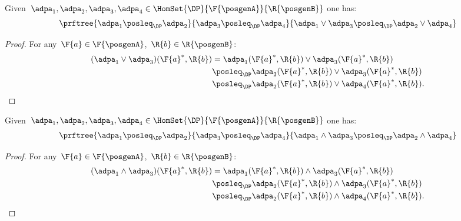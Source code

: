 \begin{lemma}
  \label{lem:coprod_mon}
  Given~$\adpa_1,\adpa_2,\adpa_3,\adpa_4 \in \HomSet{\DP}{\F{\posgenA}}{\R{\posgenB}}$ one has:
  \begin{equation*}
  \prftree{\adpa_1\posleq_\DP \adpa_2}{\adpa_3\posleq_\DP \adpa_4}{\adpa_1\vee \adpa_3\posleq_\DP \adpa_2\vee \adpa_4}
  \end{equation*}
\end{lemma}
\begin{proof}
  For any~$\F{a}\in \F{\posgenA}$,~$\R{b}\in \R{\posgenB}$:
  \begin{equation*}
    \begin{aligned}
      (\adpa_1 \vee \adpa_3)(\F{a}^*,\R{b})&=\adpa_1(\F{a}^*,\R{b})\vee \adpa_3(\F{a}^*,\R{b})\\
      &\posleq_\DP \adpa_2(\F{a}^*,\R{b})\vee \adpa_3(\F{a}^*,\R{b})\\
      &\posleq_\DP \adpa_2(\F{a}^*,\R{b})\vee \adpa_4(\F{a}^*,\R{b}).
    \end{aligned}
  \end{equation*}
\end{proof}


\begin{lemma}
  \label{lem:intersection_mon}
  Given~$\adpa_1,\adpa_2,\adpa_3,\adpa_4 \in \HomSet{\DP}{\F{\posgenA}}{\R{\posgenB}}$ one has:
  \begin{equation*}
  \prftree{\adpa_1\posleq_\DP \adpa_2}{\adpa_3\posleq_\DP \adpa_4}{\adpa_1\wedge \adpa_3\posleq_\DP \adpa_2\wedge \adpa_4}
  \end{equation*}
\end{lemma}
\begin{proof}
  For any~$\F{a}\in \F{\posgenA}$,~$\R{b}\in \R{\posgenB}$:
  \begin{equation*}
    \begin{aligned}
      (\adpa_1 \wedge \adpa_3)(\F{a}^*,\R{b})&=\adpa_1(\F{a}^*,\R{b})\wedge \adpa_3(\F{a}^*,\R{b})\\
      &\posleq_\DP \adpa_2(\F{a}^*,\R{b})\wedge \adpa_3(\F{a}^*,\R{b})\\
      &\posleq_\DP \adpa_2(\F{a}^*,\R{b})\wedge \adpa_4(\F{a}^*,\R{b}).
    \end{aligned}
  \end{equation*}
\end{proof}